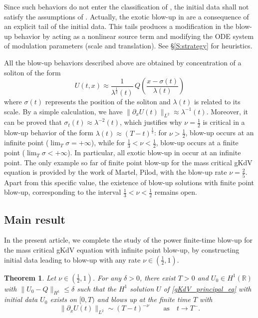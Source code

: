 \documentclass[16pt,english, oneside,reqno]{smfart}
\newcommand{\RR}{\mathbb{R}}
\newtheorem{theorem}{Theorem}[section]
\begin{document}
Since such behaviors do not enter the classification of \cite{MMPI}, the initial data
shall not satisfy the assumptions of \cite{MMPI}.
Actually, the exotic blow-up in \cite{MMPIII} are a consequence of an explicit
tail of the initial data. This tails produces a modification in the blow-up behavior
by acting as a nonlinear source term and modifying the ODE system of modulation parameters
(scale and translation). See \S \ref{S:strategy} for heuristics.

All the blow-up behaviors described above are obtained by concentration of a soliton
of the form
\[
U(t,x) \approx \frac{1}{\lambda^\frac12(t)}\, Q\left( \frac{x-\sigma(t)}{\lambda(t)}\right)
\]
where $\sigma(t)$ represents the position of the soliton and $\lambda(t)$ is related to its
scale. By a simple calculation, we have $\|\partial_x U(t)\|_{L^2}\approx \lambda^{-1}(t)$.
Moreover, it can be proved that $\sigma_t(t)\approx \lambda^{-2}(t)$,
which justifies why $\nu=\frac 12$ is critical in a
blow-up behavior of the form $\lambda(t)\approx (T-t)^\frac12$:
for $\nu>\frac 12$, blow-up occurs at an infinite point ($\lim_T \sigma=+\infty$), 
while for $\frac 13 <\nu<\frac 12$, blow-up occurs at a finite point 
($\lim_T \sigma<+\infty$).
In particular, all exotic blow-up in \cite{MMPIII} occur at an infinite point.
The only example so far of  finite point blow-up for the mass critical gKdV equation
is provided by the work \cite{Martel-Pilod-2024} of Martel, Pilod, with the blow-up rate $\nu = \frac{2}{5}$. 
Apart from this specific value, the existence of blow-up solutions with finite point blow-up, corresponding to the interval $\frac13<\nu <\frac12$ remains open.

\subsection{Main result}

In the present article,
we complete the study of the power finite-time blow-up
for the mass critical gKdV equation with infinite point blow-up,
by constructing initial data leading to blow-up with any rate $\nu \in (\frac 12, 1)$.
 
\begin{theorem}\label{Theorem_principal_result}
    Let $\nu \in (\frac 12, 1)$. For any $\delta >0$, there exist $T>0$ and $U_0 \in H^1(\RR)$ with $\|U_0 - Q\|_{H^1} \leq \delta$ such that the $H^1$ solution $U$ of \eqref{gKdV_principal_eq} with initial data $U_0$ exists on $[0,T)$ and blows up at the finite time $T$ with
    \begin{equation}
        \|\partial_x U(t)\|_{L^2} \sim (T-t)^{-\nu} \qquad \text{as}\quad t \to T^-.
    \end{equation}
\end{theorem}
\end{document}
